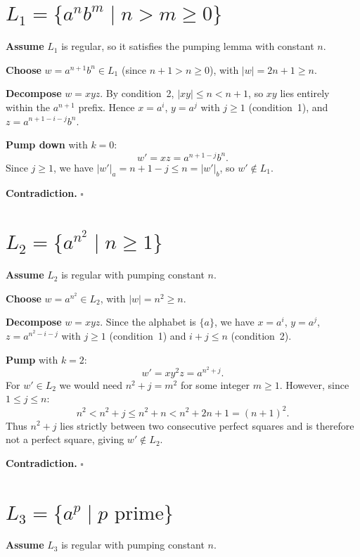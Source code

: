 \documentclass{article}
\theoremstyle{theorem}
\theoremstyle{definition}
\theoremstyle{remark}
\begin{document}
\section*{$L_1 = \{a^n b^m \mid n > m \geq 0\}$}
 
\textbf{Assume} $L_1$ is regular, so it satisfies the pumping lemma with constant $n$.
 
\medskip
\textbf{Choose} $w = a^{n+1}b^n \in L_1$ (since $n+1 > n \geq 0$), with $|w| = 2n+1 \geq n$. \checkmark
 
\medskip
\textbf{Decompose} $w = xyz$. By condition~2, $|xy| \leq n < n+1$, so $xy$ lies entirely within
the $a^{n+1}$ prefix. Hence $x = a^i$, $y = a^j$ with $j \geq 1$ (condition~1), and
$z = a^{n+1-i-j}b^n$.
 
\medskip
\textbf{Pump down} with $k = 0$:
\[
  w' = xz = a^{n+1-j}b^n.
\]
Since $j \geq 1$, we have $|w'|_a = n+1-j \leq n = |w'|_b$, so $w' \notin L_1$.
 
\medskip
\textbf{Contradiction.} $\square$
 
\section*{$L_2 = \{a^{n^2} \mid n \geq 1\}$}
 
\textbf{Assume} $L_2$ is regular with pumping constant $n$.
 
\medskip
\textbf{Choose} $w = a^{n^2} \in L_2$, with $|w| = n^2 \geq n$. \checkmark
 
\medskip
\textbf{Decompose} $w = xyz$. Since the alphabet is $\{a\}$, we have $x = a^i$, $y = a^j$,
$z = a^{n^2 - i - j}$ with $j \geq 1$ (condition~1) and $i + j \leq n$ (condition~2).
 
\medskip
\textbf{Pump} with $k = 2$:
\[
  w' = xy^2 z = a^{n^2 + j}.
\]
For $w' \in L_2$ we would need $n^2 + j = m^2$ for some integer $m \geq 1$. However,
since $1 \leq j \leq n$:
\[
  n^2 < n^2 + j \leq n^2 + n < n^2 + 2n + 1 = (n+1)^2.
\]
Thus $n^2 + j$ lies strictly between two consecutive perfect squares and is therefore not
a perfect square, giving $w' \notin L_2$.
 
\medskip
\textbf{Contradiction.} $\square$
 
\section*{$L_3 = \{a^p \mid p \text{ prime}\}$}
 
\textbf{Assume} $L_3$ is regular with pumping constant $n$.
 
\end{document}
